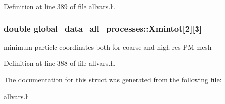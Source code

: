 Definition at line 389 of file allvars.h.

\hypertarget{structglobal__data__all__processes_a767b48fe7db038566f36edbb935d56f8}{
\subsubsection[{Xmintot}]{\setlength{\rightskip}{0pt plus 5cm}double {\bf global\_\-data\_\-all\_\-processes::Xmintot}\mbox{[}2\mbox{]}\mbox{[}3\mbox{]}}}
\label{structglobal__data__all__processes_a767b48fe7db038566f36edbb935d56f8}
minimum particle coordinates both for coarse and high-\/res PM-\/mesh 

Definition at line 388 of file allvars.h.



The documentation for this struct was generated from the following file:\begin{DoxyCompactItemize}
\item 
\hyperlink{allvars_8h}{allvars.h}\end{DoxyCompactItemize}
